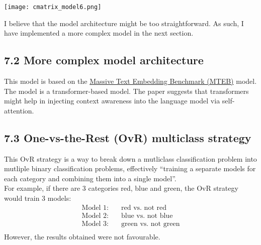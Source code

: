 \texttt{[image: cmatrix\_model6.png]}

I believe that the model architecture might be too straightforward. As such, I have implemented a more complex model in the next section.

\subsection*{7.2 More complex model architecture}
This model is based on the \href{https://arxiv.org/pdf/2210.07316.pdf}{Massive Text Embedding Benchmark (MTEB)} model. The model is a transformer-based model. The paper suggests that transformers might help in injecting context awareness into the language model via self-attention.

\subsection*{7.3 One-vs-the-Rest (OvR) multiclass strategy}
This OvR strategy is a way to break down a mutliclass classification problem into mutliple binary classification problems, effectively ``training a separate models for each category and combining them into a single model''. \\
For example, if there are 3 categories red, blue and green, the OvR strategy would train 3 models: \\
\begin{align*}
    \text{Model 1:} \quad & \text{red vs. not red} \\
    \text{Model 2:} \quad & \text{blue vs. not blue} \\
    \text{Model 3:} \quad & \text{green vs. not green} \\
\end{align*}
However, the results obtained were not favourable.